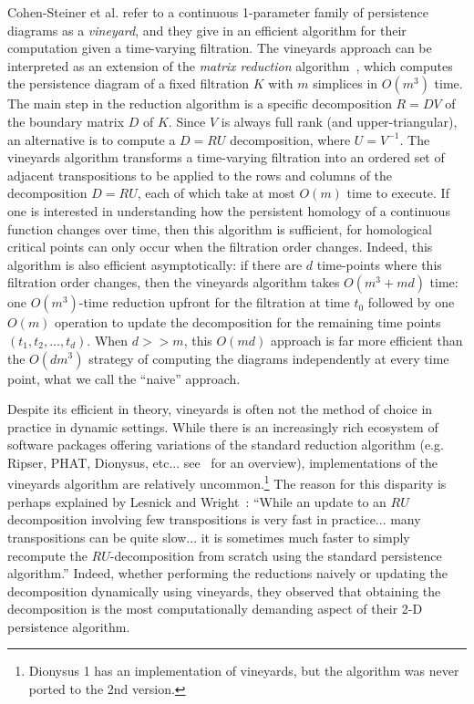 \documentclass{siamart190516}
\begin{document}
Cohen-Steiner et al. refer to a continuous 1-parameter family of persistence diagrams as a \emph{vineyard}, and they give in \cite{cohen2006vines} an efficient algorithm for their computation given a time-varying filtration. 
The vineyards approach can be interpreted as an extension of the \emph{matrix reduction} algorithm~\cite{zomorodian2005computing}, which computes the persistence diagram of a fixed filtration $K$ with $m$ simplices in $O(m^3)$ time.
The main step in the reduction algorithm is a specific decomposition $R = D V$ of the boundary matrix $D$ of $K$. 
Since $V$ is always full rank (and upper-triangular), an alternative is to compute a $D = RU$ decomposition, where $U = V^{-1}$. 
The vineyards algorithm transforms a time-varying filtration into an ordered set of adjacent transpositions to be applied to the rows and columns of the decomposition $D = RU$, each of which take at most $O(m)$ time to execute. If one is interested in understanding how the persistent homology of a continuous function changes over time, then this algorithm is sufficient, for  homological critical points can only occur when the filtration order changes. 
Indeed, this algorithm is also efficient  asymptotically: if there are $d$ time-points where this filtration order changes, then the vineyards algorithm takes $O(m^3 + md)$ time: one $O(m^3)$-time reduction upfront for the filtration at time $t_0$ followed by one $O(m)$ operation to update the decomposition for the remaining time points $(t_1, t_2, \dots, t_d)$. When $d >> m$, this $O(md)$ approach is far more efficient than the $O(dm^3)$  strategy of computing the diagrams independently at every time point, what we call the ``naive'' approach. 

Despite its efficient in theory, vineyards is often not the method of choice in practice in dynamic settings. 
While there is an increasingly rich ecosystem of software packages offering variations of the standard reduction algorithm (e.g. Ripser, PHAT, Dionysus, etc... see~\cite{otter2017roadmap} for an overview), implementations of the vineyards algorithm are relatively uncommon.\footnote{Dionysus 1 has an implementation of vineyards, but the algorithm was never ported to the 2nd version.} The reason for this disparity is perhaps explained by Lesnick and Wright~\cite{lesnick2015interactive}: ``While an update to an $RU$ decomposition involving few transpositions is very fast in practice... many transpositions can be quite slow... it is sometimes much faster to simply recompute the $RU$-decomposition from scratch using the standard persistence algorithm.'' Indeed, whether performing the reductions naively or updating the decomposition dynamically using vineyards, they observed that obtaining the decomposition is the most computationally demanding aspect of their 2-D persistence algorithm.
\end{document}
